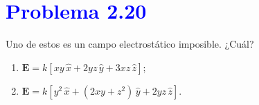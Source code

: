 \documentclass[12pt]{article}
\newcommand{\question}[1]{\textcolor{blue}{\textbf{#1}}}
\begin{document}

\section*{\question{ Problema 2.20}}Uno de estos es un campo electrostático imposible. ¿Cuál?


\begin{enumerate}[label=(\alph*)]
    \item $\mathbf{E} = k[xy\,\hat{x} + 2yz\,\hat{y} + 3xz\,\hat{z}]$;
    \item $\mathbf{E} = k[y^2\,\hat{x} + (2xy + z^2)\,\hat{y} + 2yz\,\hat{z}]$.
\end{enumerate}
\end{document}
